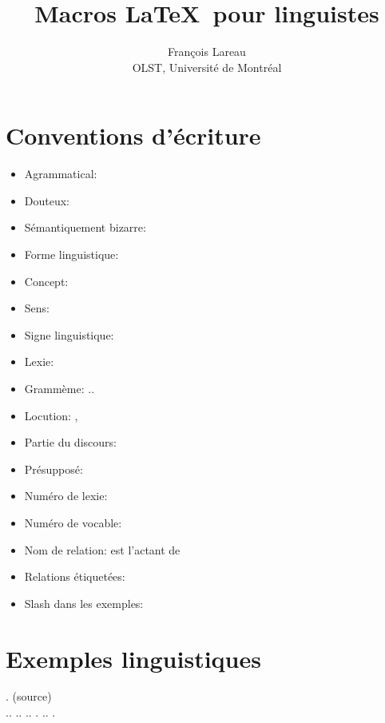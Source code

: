 \documentclass{article}
\author{François Lareau\\OLST, Université de Montréal}
\title{Macros \LaTeX\ pour linguistes}
\begin{document}
\maketitle

\section{Conventions d'écriture}

\begin{itemize}
	\item Agrammatical: \ungr{}
	\item Douteux: \doubt{}
	\item Sémantiquement bizarre: \infel{}
	\item Forme linguistique: 
	\item Concept: 
	\item Sens: 
	\item Signe linguistique: \comb{}
	\item Lexie: 
	\item Grammème: ..
	\item Locution: , 
	\item Partie du discours: 
	\item Présupposé: 
	\item Numéro de lexie: 
	\item Numéro de vocable: 
	\item Nom de relation:  est l'actant  de 
	\item Relations étiquetées: 
	\item Slash dans les exemples: 
\end{itemize}


\section{Exemples linguistiques}

\ex. \label{ex:silence} \hfill(source)\\
		 \smaller{} .. ..  .. .  .. . \\
\end{document}
